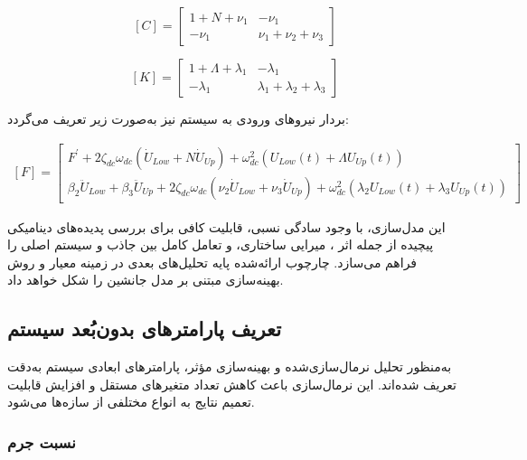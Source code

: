 \begin{equation}
\left[C\right] = 
\begin{bmatrix}
1 + N + \nu_1 & -\nu_1 \\
-\nu_1 & \nu_1 + \nu_2 + \nu_3
\end{bmatrix}
\end{equation}

\begin{equation}
\left[K\right] = 
\begin{bmatrix}
1 + \Lambda + \lambda_1 & -\lambda_1 \\
-\lambda_1 & \lambda_1 + \lambda_2 + \lambda_3
\end{bmatrix}
\end{equation}

بردار نیروهای ورودی به سیستم نیز به‌صورت زیر تعریف می‌گردد:

\begin{align}
\left[F\right] = 
\begin{bmatrix}
F^\prime + 2\zeta_{dc}\omega_{dc} \left( \dot{U}_{Low} + N \dot{U}_{Up} \right) + \omega_{dc}^2 \left( U_{Low}(t) + \Lambda U_{Up}(t) \right) \\
\beta_2 \ddot{U}_{Low} + \beta_3 \ddot{U}_{Up} + 2\zeta_{dc}\omega_{dc} \left( \nu_2 \dot{U}_{Low} + \nu_3 \dot{U}_{Up} \right) + \omega_{dc}^2 \left( \lambda_2 U_{Low}(t) + \lambda_3 U_{Up}(t) \right)
\end{bmatrix}
\end{align}

این مدل‌سازی، با وجود سادگی نسبی، قابلیت کافی برای بررسی پدیده‌های دینامیکی پیچیده از جمله اثر ، میرایی ساختاری، و تعامل کامل بین جاذب و سیستم اصلی را فراهم می‌سازد. چارچوب ارائه‌شده پایه تحلیل‌های بعدی در زمینه معیار  و روش بهینه‌سازی مبتنی بر مدل جانشین را شکل خواهد داد.


\subsection{تعریف پارامترهای بدون‌بُعد سیستم}

به‌منظور تحلیل نرمال‌سازی‌شده و بهینه‌سازی مؤثر، پارامترهای ابعادی سیستم به‌دقت تعریف شده‌اند. این نرمال‌سازی باعث کاهش تعداد متغیرهای مستقل و افزایش قابلیت تعمیم نتایج به انواع مختلفی از سازه‌ها می‌شود.

\subsubsection*{نسبت جرم}

